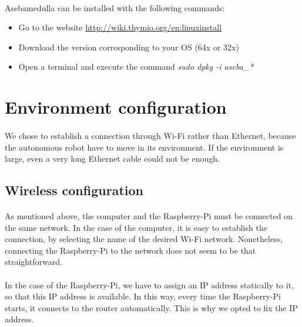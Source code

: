 \documentclass[12pt]{report}
\begin{document}
\paragraph{}
Asebamedulla can be installed with the following commands:
\begin{itemize}
	\item Go to the website \url{http://wiki.thymio.org/en:linuxinstall}
	\item Download the version corresponding to your OS (64x or 32x)
	\item Open a terminal and execute the command \emph{sudo dpkg -i aseba\_*}
\end{itemize}
\section{Environment configuration}
\paragraph{}
We chose to establish a connection through Wi-Fi rather than Ethernet, because the autonomous robot have to move in its environment. If the environment is large, even a very long Ethernet cable could not be enough.

\subsection{Wireless configuration}
\paragraph{}
As mentioned above, the computer and the Raspberry-Pi must be connected on the same network. In the case of the computer, it is easy to establish the connection, by selecting the name of the desired Wi-Fi network. Nonetheless, connecting the Raspberry-Pi to the network does not seem to be that straightforward.
\paragraph{}
In the case of the Raspberry-Pi, we have to assign an IP address statically to it, so that this IP address is available. In this way, every time the Raspberry-Pi starts, it connects to the router automatically. This is why we opted to fix the IP address. 
\end{document}
